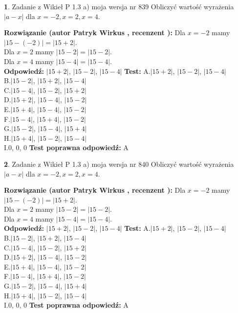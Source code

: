 \documentclass[12pt, a4paper]{article}
\theoremstyle{definition} %
\newtheorem{zad}{}
\newcommand{\zadStart}[1]{\begin{zad}#1\newline}
\newcommand{\zadStop}{\end{zad}}
\newcommand{\rozwStart}[2]{\noindent \textbf{Rozwiązanie (autor #1 , recenzent #2): }\newline}
\newcommand{\rozwStop}{\newline}
\newcommand{\odpStart}{\noindent \textbf{Odpowiedź:}\newline}
\newcommand{\odpStop}{\newline}
\newcommand{\testStart}{\noindent \textbf{Test:}\newline}
\newcommand{\testStop}{\newline}
\newcommand{\kluczStart}{\noindent \textbf{Test poprawna odpowiedź:}\newline}
\newcommand{\kluczStop}{\newline}
\begin{document}
\zadStart{Zadanie z Wikieł P 1.3 a) moja wersja nr 839}
Obliczyć wartość wyrażenia $|a - x|$ dla $x=-2,x=2,x=4$.
\zadStop
\rozwStart{Patryk Wirkus}{}
Dla $x = -2$ mamy $|15 - (-2)| = |15 + 2|$.\\
Dla $x = 2$ mamy $|15 - 2| = |15 - 2|$.\\
Dla $x = 4$ mamy $|15 - 4| = |15 - 4|$.\\
\rozwStop
\odpStart
$|15 + 2|$, $|15 - 2|$, $|15 - 4|$
\odpStop
\testStart
A.$|15 + 2|$, $|15 - 2|$, $|15 - 4|$\\
B.$|15 - 2|$, $|15 + 2|$, $|15 - 4|$\\
C.$|15 - 4|$, $|15 - 2|$, $|15 + 2|$\\
D.$|15 + 2|$, $|15 - 4|$, $|15 - 2|$\\
E.$|15 + 4|$, $|15 - 4|$, $|15 - 2|$\\
F.$|15 - 4|$, $|15 + 4|$, $|15 - 2|$\\
G.$|15 - 2|$, $|15 - 4|$, $|15 + 4|$\\
H.$|15 + 4|$, $|15 - 2|$, $|15 - 4|$\\
I.$0$, $0$, $0$
\testStop
\kluczStart
A
\kluczStop



\zadStart{Zadanie z Wikieł P 1.3 a) moja wersja nr 840}
Obliczyć wartość wyrażenia $|a - x|$ dla $x=-2,x=2,x=4$.
\zadStop
\rozwStart{Patryk Wirkus}{}
Dla $x = -2$ mamy $|15 - (-2)| = |15 + 2|$.\\
Dla $x = 2$ mamy $|15 - 2| = |15 - 2|$.\\
Dla $x = 4$ mamy $|15 - 4| = |15 - 4|$.\\
\rozwStop
\odpStart
$|15 + 2|$, $|15 - 2|$, $|15 - 4|$
\odpStop
\testStart
A.$|15 + 2|$, $|15 - 2|$, $|15 - 4|$\\
B.$|15 - 2|$, $|15 + 2|$, $|15 - 4|$\\
C.$|15 - 4|$, $|15 - 2|$, $|15 + 2|$\\
D.$|15 + 2|$, $|15 - 4|$, $|15 - 2|$\\
E.$|15 + 4|$, $|15 - 4|$, $|15 - 2|$\\
F.$|15 - 4|$, $|15 + 4|$, $|15 - 2|$\\
G.$|15 - 2|$, $|15 - 4|$, $|15 + 4|$\\
H.$|15 + 4|$, $|15 - 2|$, $|15 - 4|$\\
I.$0$, $0$, $0$
\testStop
\kluczStart
A
\kluczStop
\end{document}
